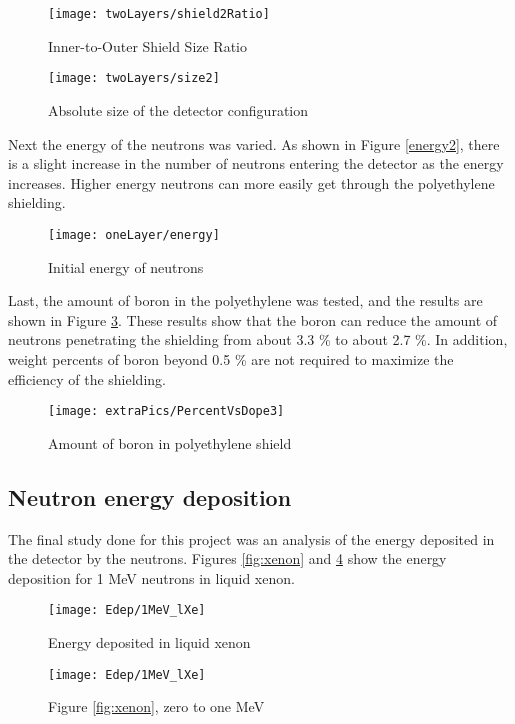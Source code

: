 \documentclass[12pt]{article}
\begin{document}
\begin{figure}[H]
  \centering
  \begin{minipage}[t]{0.45\linewidth}
    \texttt{[image: twoLayers/shield2Ratio]}
    \caption{Inner-to-Outer Shield Size Ratio}
    \label{fig:shield2Ratio}
  \end{minipage}
  \quad
  \begin{minipage}[t]{0.45\linewidth}
    \texttt{[image: twoLayers/size2]}
    \caption{Absolute size of the detector configuration}
    \label{fig:size2}
  \end{minipage}
\end{figure}

Next the energy of the neutrons was varied. As shown in Figure \ref{energy2}, there is a slight increase in the number of neutrons entering the detector as the energy increases. Higher energy neutrons can more easily get through the polyethylene shielding.

\begin{figure}[H]
 \centering
 \texttt{[image: oneLayer/energy]}
 \caption{Initial energy of neutrons}
 \label{fig:energy2}
\end{figure}

Last, the amount of boron in the polyethylene was tested, and the results are shown in Figure \ref{fig:dope}. These results show that the boron can reduce the amount of neutrons penetrating the shielding from about 3.3 \% to about 2.7 \%. In addition, weight percents of boron beyond 0.5 \% are not required to maximize the efficiency of the shielding.

\begin{figure}[H]
  \centering
  \texttt{[image: extraPics/PercentVsDope3]}
  \caption{Amount of boron in polyethylene shield}
  \label{fig:dope}
  \centering
\end{figure}

\subsection{Neutron energy deposition}
The final study done for this project was an analysis of the energy deposited in the detector by the neutrons. Figures \ref{fig:xenon} and \ref{fig:xenon2} show the energy deposition for 1 MeV neutrons in liquid xenon.

\begin{figure}[H]
  \centering
  \begin{minipage}[t]{0.45\linewidth}
    \texttt{[image: Edep/1MeV\_lXe]}
    \caption{Energy deposited in liquid xenon}
    \label{fig:xenon}
  \end{minipage}
  \quad
  \begin{minipage}[t]{0.45\linewidth}
    \texttt{[image: Edep/1MeV\_lXe]}
    \caption{Figure \ref{fig:xenon}, zero to one MeV}
    \label{fig:xenon2}
  \end{minipage}
\end{figure}
\end{document}
